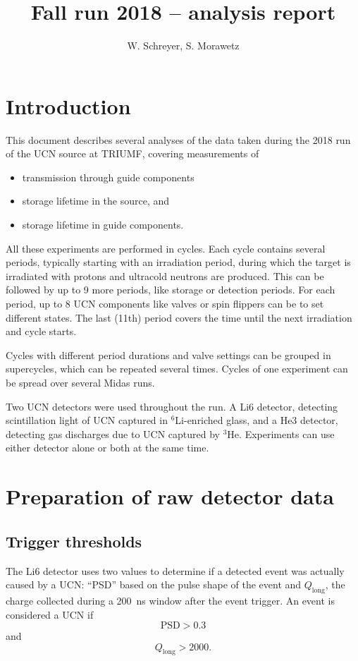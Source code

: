 \documentclass[10pt,letterpaper]{article}
\author{W. Schreyer, S. Morawetz}
\title{Fall run 2018 -- analysis report}
\begin{document}
\maketitle

\tableofcontents

\section{Introduction}

This document describes several analyses of the data taken during the 2018 run of the UCN source at TRIUMF, covering measurements of
\begin{itemize}
\item transmission through guide components
\item storage lifetime in the source, and
\item storage lifetime in guide components.
\end{itemize}

All these experiments are performed in cycles. Each cycle contains several periods, typically starting with an irradiation period, during which the target is irradiated with protons and ultracold neutrons are produced. This can be followed by up to 9 more periods, like storage or detection periods. For each period, up to 8 UCN components like valves or spin flippers can be to set different states. The last (11th) period covers the time until the next irradiation and cycle starts.

Cycles with different period durations and valve settings can be grouped in supercycles, which can be repeated several times. Cycles of one experiment can be spread over several Midas runs.

Two UCN detectors were used throughout the run. A Li6 detector, detecting scintillation light of UCN captured in $^6$Li-enriched glass, and a He3 detector, detecting gas discharges due to UCN captured by $^3$He. Experiments can use either detector alone or both at the same time.


\section{Preparation of raw detector data}

\subsection{Trigger thresholds}

The Li6 detector uses two values to determine if a detected event was actually caused by a UCN: ``PSD'' based on the pulse shape of the event and $Q_\mathrm{long}$, the charge collected during a \SI{200}{\nano\second} window after the event trigger. An event is considered a UCN if
\begin{equation}
\mathrm{PSD} > 0.3
\end{equation}
and
\begin{equation}
Q_\mathrm{long} > 2000.
\end{equation}
\end{document}
